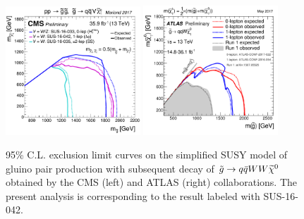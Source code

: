 \begin{figure}[!hb]
\centering
  \includegraphics[width=0.45\textwidth]{Plots/SUSY/CMS_SUSY_Strong_1Step}
   \includegraphics[width=0.45\textwidth]{Plots/SUSY/ATLAS_SUSY_Strong_1step}
  \caption{ 95\% C.L. exclusion limit curves on the simplified SUSY model of gluino pair production with subsequent decay of $\tilde{g}\rightarrow q\bar{q}WW\widetilde{\chi}^0$ obtained by the CMS (left) and ATLAS (right) collaborations. The present analysis is corresponding to the result labeled with SUS-16-042.
  }
  \label{fig:SUSY_strong_1step}
\end{figure}
